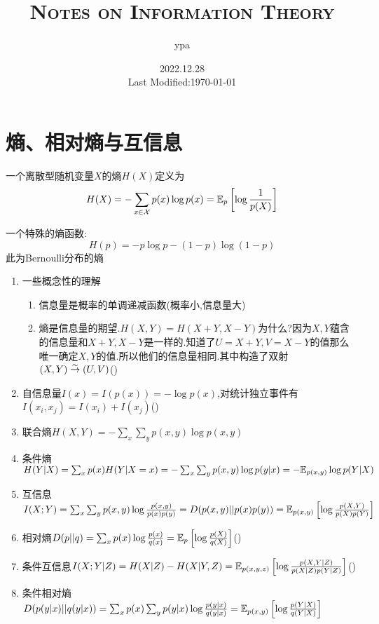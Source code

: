 \documentclass{article}
\title{\textsc{Notes on Information Theory}}
\author{ypa}
\date{2022.12.28\\%
Last Modified:\today}
\begin{document}
\maketitle
\tableofcontents

\section{熵、相对熵与互信息}
\begin{definition}
	一个离散型随机变量$X$的熵$H(X)$定义为
	\[H(X)=-\sum_{x\in \mathcal{X}}p(x)\log p(x)=\mathbb{E}_p\left[\log \frac{1}{p(X)}\right]\]
\end{definition}
\begin{remark}
	一个特殊的熵函数:\[H(p) = -p\log p-(1-p)\log (1-p)\]
	此为Bernoulli分布的熵
\end{remark}
\begin{enumerate}[label=(\arabic*)]
	\item 一些概念性的理解
				\begin{enumerate}[label=(\alph*)]
					\item 信息量是概率的单调递减函数(概率小,信息量大)
					\item 熵是信息量的期望.$H(X,Y) = H(X+Y,X-Y)$为什么?因为$X,Y$蕴含的信息量和$X+Y,X-Y$是一样的.知道了$U=X+Y,V=X-Y$的值那么唯一确定$X,Y$的值.所以他们的信息量相同.其中构造了{\red 双射}$(X,Y)\stackrel{\sim}{\rightarrow} (U,V)$\quad ({})
				\end{enumerate}
	\item 自信息量$I(x)=I(p(x))=-\log p(x)$,对统计独立事件有$I(x_i,x_j)=I(x_i)+I(x_j)$\quad ({})
	\item 联合熵$H(X,Y)=-\sum_x \sum_y p(x,y)\log p(x,y)$
	\item 条件熵$H(Y|X) = \sum_x p(x)H(Y|X=x) = -\sum_x \sum_y p(x,y)\log p(y|x) = -\mathbb{E}_{p(x,y)}\log p(Y|X)$
	\item 互信息$I(X;Y)=\sum_x \sum_y p(x,y)\log \frac{p(x,y)}{p(x)p(y)} = D(p(x,y)||p(x)p(y))=\mathbb{E}_{p(x,y)}\left[\log \frac{p(X,Y)}{p(X)p(Y)}\right]$
	\item 相对熵$D(p||q)=\sum_x p(x)\log \frac{p(x)}{q(x)}=\mathbb{E}_p\left[\log \frac{p(X)}{q(X)}\right]$\quad ({})
	\item 条件互信息$I(X;Y|Z) = H(X|Z)-H(X|Y,Z) = \mathbb{E}_{p(x,y,z)}\left[\log \frac{p(X,Y|Z)}{p(X|Z)p(Y|Z)}\right]$\quad ({})
	\item 条件相对熵$D(p(y|x)||q(y|x)) = \sum_x p(x)\sum_y p(y|x)\log \frac{p(y|x)}{q(y|x)} = \mathbb{E}_{p(x,y)}\left[\log \frac{p(Y|X)}{q(Y|X)}\right]$
				\begin{remark}

\end{remark}
\end{enumerate}
\end{document}
